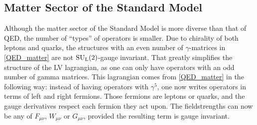 \documentclass[12pt]{revtex4}
\newcommand{\wt}{\widetilde}
\newcommand{\suc}{{{\rm SU}_{\rm C}(3)}}
\newcommand{\sul}{{{\rm SU}_{\rm L}(2)}}
\begin{document}


\subsection{Matter Sector of the Standard Model}
\label{matter_SM}
	Although the matter sector of the Standard Model is more diverse
	than that of QED, the number of ``types'' of operators is smaller.
	Due to chirality of both leptons and quarks, the structures 
	with an even number of $ \gamma $-matrices in \eqref{QED_matter}
	are not $ \sul $-gauge invariant. 
	That greatly simplifies the structure of the LV lagrangian,
	as one can only have operators with an odd number of gamma
	matrices.
	This lagrangian comes from \eqref{QED_matter} in the following way:
	instead of having operators with $ \gamma^5 $, one now writes
	operators in terms of left and right fermions. 
	Those fermions are leptons or quarks, and the gauge derivatives
	respect each fermion they act upon. 
	The fieldstrengths can now be any of $ F_{\mu\nu} $, 
	$ W_{\mu\nu} $ or $ G_{\mu\nu} $, provided the resulting term
	is gauge invariant. 
	
\end{document}
